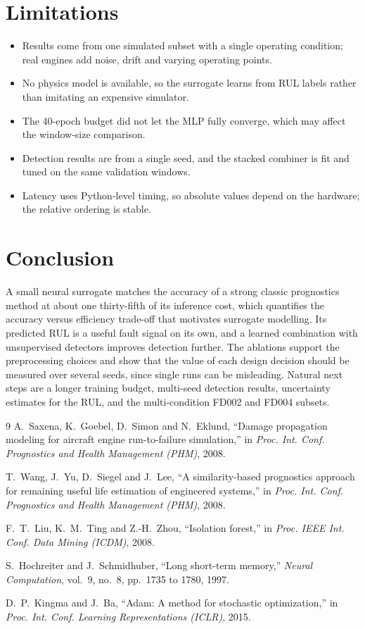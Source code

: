 \documentclass[11pt,a4paper]{article}
\begin{document}
\section{Limitations}
\begin{itemize}
  \item Results come from one simulated subset with a single operating
        condition; real engines add noise, drift and varying operating points.
  \item No physics model is available, so the surrogate learns from RUL labels
        rather than imitating an expensive simulator.
  \item The 40-epoch budget did not let the MLP fully converge, which may
        affect the window-size comparison.
  \item Detection results are from a single seed, and the stacked combiner is
        fit and tuned on the same validation windows.
  \item Latency uses Python-level timing, so absolute values depend on the
        hardware; the relative ordering is stable.
\end{itemize}

\section{Conclusion}
A small neural surrogate matches the accuracy of a strong classic prognostics
method at about one thirty-fifth of its inference cost, which quantifies the
accuracy versus efficiency trade-off that motivates surrogate modelling. Its
predicted RUL is a useful fault signal on its own, and a learned combination
with unsupervised detectors improves detection further. The ablations support
the preprocessing choices and show that the value of each design decision
should be measured over several seeds, since single runs can be misleading.
Natural next steps are a longer training budget, multi-seed detection results,
uncertainty estimates for the RUL, and the multi-condition FD002 and FD004
subsets.

\begin{thebibliography}{9}
A.~Saxena, K.~Goebel, D.~Simon and N.~Eklund,
``Damage propagation modeling for aircraft engine run-to-failure simulation,''
in \emph{Proc. Int. Conf. Prognostics and Health Management (PHM)}, 2008.

T.~Wang, J.~Yu, D.~Siegel and J.~Lee,
``A similarity-based prognostics approach for remaining useful life estimation
of engineered systems,''
in \emph{Proc. Int. Conf. Prognostics and Health Management (PHM)}, 2008.

F.~T.~Liu, K.~M.~Ting and Z.-H.~Zhou,
``Isolation forest,''
in \emph{Proc. IEEE Int. Conf. Data Mining (ICDM)}, 2008.

S.~Hochreiter and J.~Schmidhuber,
``Long short-term memory,''
\emph{Neural Computation}, vol.~9, no.~8, pp.~1735 to 1780, 1997.

D.~P.~Kingma and J.~Ba,
``Adam: A method for stochastic optimization,''
in \emph{Proc. Int. Conf. Learning Representations (ICLR)}, 2015.
\end{thebibliography}
\end{document}
